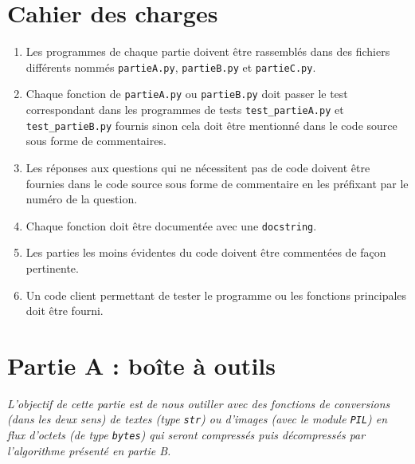 \documentclass[a4paper, french, 12pt]{article}  %
\newcounter{thme}
\newcounter{alg}
\newcounter{prog}
\begin{document}



\section{Cahier des charges}

{\itshape

\begin{enumerate}
\item Les programmes de  chaque partie doivent être rassemblés dans des fichiers différents nommés \texttt{partieA.py}, \texttt{partieB.py} et \texttt{partieC.py}.
\item Chaque fonction de \texttt{partieA.py} ou \texttt{partieB.py} doit passer le test  correspondant dans les programmes de tests \texttt{test\_partieA.py} et \texttt{test\_partieB.py}  fournis sinon cela doit être mentionné dans le code source sous forme de commentaires.
\item Les réponses aux questions qui ne nécessitent pas de code doivent être fournies dans le code source sous forme de commentaire en les préfixant par le numéro de la question.
\item Chaque fonction doit être documentée avec une \texttt{docstring}.
\item Les parties les moins évidentes du code doivent être commentées de façon pertinente.
\item Un code client permettant de tester le programme ou les fonctions principales doit être fourni.
\end{enumerate}


} 

\section{Partie A : boîte à outils}

{\itshape L'objectif de cette partie est de nous outiller avec des fonctions de conversions (dans les deux sens) de textes (type \texttt{str}) ou d'images (avec le module \texttt{PIL}) en flux d'octets (de type \texttt{bytes}) qui seront compressés puis décompressés par l'algorithme présenté en partie B.}
\end{document}
